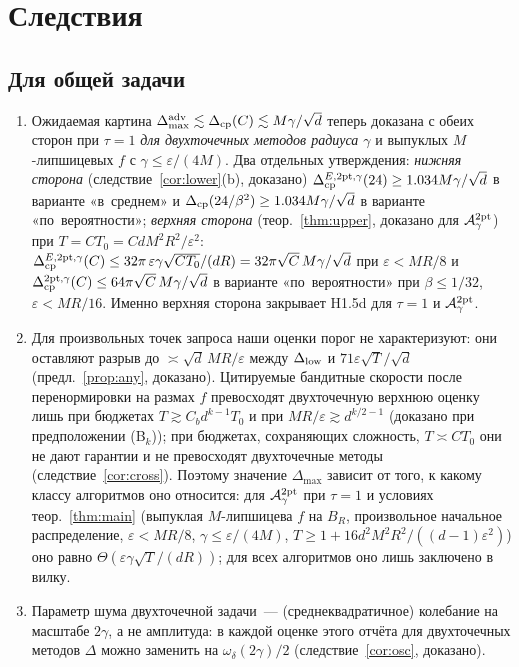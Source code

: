 \documentclass[11pt,a4paper]{article}
\numberwithin{equation}{section}
\theoremstyle{definition}
\theoremstyle{remark}
\newcommand{\Dmax}{\Delta_{\max}}\newcommand{\Dcp}{\Delta_{\rm cp}}\newcommand{\Dlow}{\Delta_{\rm low}}
\begin{document}
\section{Следствия}\label{sec:contrib}
\subsection{Для общей задачи}
\begin{enumerate}
\item Ожидаемая картина $\Delta^{\rm adv}_{\max}\lesssim\Dcp(C)\lesssim M\gamma/\sqrt d$ теперь доказана с обеих сторон при $\tau=1$ \emph{для двухточечных методов радиуса $\gamma$} и выпуклых $M$-липшицевых $f$ с $\gamma\le\varepsilon/(4M)$. Два отдельных утверждения: \emph{нижняя сторона} (следствие~\ref{cor:lower}(b), доказано) $\Dcp^{E,\mathrm{2pt},\gamma}(24)\ge1.034M\gamma/\sqrt d$ в варианте «в~среднем» и $\Dcp(24/\beta^2)\ge1.034M\gamma/\sqrt d$ в варианте «по~вероятности»; \emph{верхняя сторона} (теор.~\ref{thm:upper}, доказано для $\mathcal A^{\rm 2pt}_\gamma$) при $T=CT_0=CdM^2R^2/\varepsilon^2$: $\Dcp^{E,\mathrm{2pt},\gamma}(C)\le32\pi\,\varepsilon\gamma\sqrt{CT_0}/(dR)=32\pi\sqrt C\,M\gamma/\sqrt d$ при $\varepsilon<MR/8$ и $\Dcp^{\mathrm{2pt},\gamma}(C)\le64\pi\sqrt C\,M\gamma/\sqrt d$ в варианте «по~вероятности» при $\beta\le1/32$, $\varepsilon<MR/16$. Именно верхняя сторона закрывает H1.5d для $\tau=1$ и $\mathcal A^{\rm 2pt}_\gamma$.
\item Для произвольных точек запроса наши оценки порог не характеризуют: они оставляют разрыв до $\asymp\sqrt d\,MR/\varepsilon$ между $\Dlow$ и $71\varepsilon\sqrt T/\sqrt d$ (предл.~\ref{prop:any}, доказано). Цитируемые бандитные скорости после перенормировки на размах $f$ превосходят двухточечную верхнюю оценку лишь при бюджетах $T\gtrsim C_bd^{k-1}T_0$ и при $MR/\varepsilon\gtrsim d^{k/2-1}$ (доказано при предположении (B$_k$)); при бюджетах, сохраняющих сложность, $T\asymp CT_0$ они не дают гарантии и не превосходят двухточечные методы (следствие~\ref{cor:cross}). Поэтому значение $\Dmax$ зависит от того, к какому классу алгоритмов оно относится: для $\mathcal A^{\rm 2pt}_\gamma$ при $\tau=1$ и условиях теор.~\ref{thm:main} (выпуклая $M$-липшицева $f$ на $B_R$, произвольное начальное распределение, $\varepsilon<MR/8$, $\gamma\le\varepsilon/(4M)$, $T\ge1+16d^2M^2R^2/((d-1)\varepsilon^2)$) оно равно $\Theta(\varepsilon\gamma\sqrt T/(dR))$; для всех алгоритмов оно лишь заключено в вилку.
\item Параметр шума двухточечной задачи~--- (среднеквадратичное) колебание на масштабе $2\gamma$, а не амплитуда: в каждой оценке этого отчёта для двухточечных методов $\Delta$ можно заменить на $\omega_\delta(2\gamma)/2$ (следствие~\ref{cor:osc}, доказано).
\end{enumerate}
\end{document}
